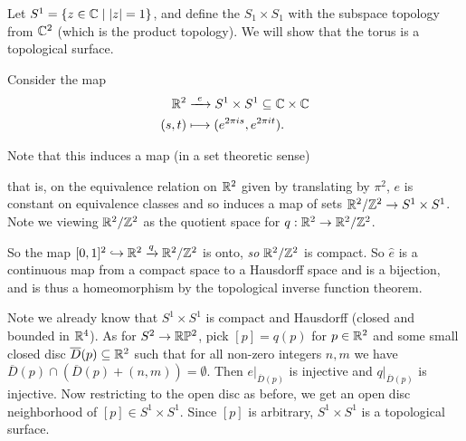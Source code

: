\documentclass[a4paper]{scrartcl}
\begin{document}
\begin{example}[Torus]
    Let $S^1 = \{z \in \mathbb{C} \mid |z| = 1\}$, and define the  $S_1 \times S_1$ with the subspace topology from $\mathbb{C}^2$ (which is the product topology). We will show that the torus is a topological surface.

    Consider the map
    \begin{align*}
        \mathbb{R}^2 &\xrightarrow{\ e\ } S^1 \times S^1 \subseteq \mathbb{C} \times \mathbb{C} \\
        (s, t) & \longmapsto (e^{2\pi i s}, e^{2 \pi i t}).
    \end{align*}

    Note that this induces a map (in a set theoretic sense)
    \begin{center}
    \end{center}
    that is, on the equivalence relation on $\mathbb{R}^2$ given by translating by $\pi^2$, $e$ is constant on equivalence classes and so induces a map of sets $\mathbb{R}^2/\mathbb{Z}^2 \rightarrow S^1 \times S^1$. Note we viewing $\mathbb{R}^2/\mathbb{Z}^2$ as the quotient space for $q: \mathbb{R}^2 \rightarrow \mathbb{R}^2/\mathbb{Z}^2$.

    So the map $[0, 1]^2 \hookrightarrow \mathbb{R}^2 \xrightarrow{q} \mathbb{R}^2/\mathbb{Z}^2$ is onto, \emph{so} $\mathbb{R}^2/\mathbb{Z}^2$ is compact. So $\hat{e}$ is a continuous map from a compact space to a Hausdorff space and is a bijection, and is thus a homeomorphism by the topological inverse function theorem.

    Note we already know that $S^1 \times S^1$ is compact and Hausdorff (closed and bounded in $\mathbb{R}^4$). As for $S^2 \rightarrow \mathbb{R}\mathbb{P}^2$, pick $[p] = q(p)$ for $p \in \mathbb{R}^2$ and some small closed disc $\overline{D}(p) \subseteq \mathbb{R}^2$ such that for all non-zero integers $n, m$ we have $\overline{D}(p) \cap (\overline{D}(p) + (n, m)) = \emptyset$.
    Then $e|_{\overline{D}(p)}$ is injective and $q|_{\overline{D}(p)}$ is injective.
    Now restricting to the open disc as before, we get an open disc neighborhood of $[p] \in S^1 \times S^1$.
    Since $[p]$ is arbitrary, $S^1 \times S^1$ is a topological surface.


\end{example}
\end{document}
